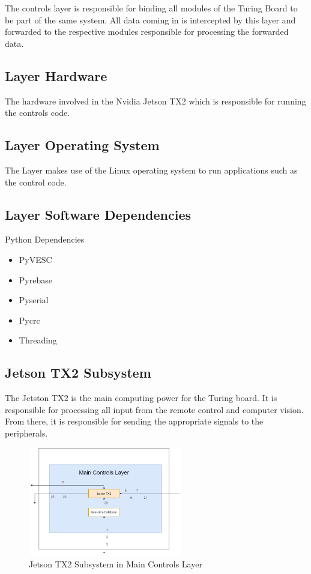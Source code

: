 The controls layer is responsible for binding all modules of the Turing Board to be part of the same system. All data coming in is intercepted by this layer and forwarded to the respective modules responsible for processing the forwarded data.

\subsection{Layer Hardware}
The hardware involved in the Nvidia Jetson TX2 which is responsible for running the controls code.

\subsection{Layer Operating System}
The Layer makes use of the Linux operating system to run applications such as the control code.

\subsection{Layer Software Dependencies}
Python Dependencies
\begin{itemize}
    \item PyVESC
    \item Pyrebase
    \item Pyserial
    \item Pycrc
    \item Threading
\end{itemize}

\subsection{Jetson TX2 Subsystem}
The Jetston TX2 is the main computing power for the Turing board. It is responsible for processing all input from the remote control and computer vision. From there, it is responsible for sending the appropriate signals to the peripherals.

\begin{figure}[h!]
	\centering
 	\includegraphics[width=0.60\textwidth]{images/Jetson.png}
 \caption{Jetson TX2 Subsystem in Main Controls Layer}
\end{figure}

